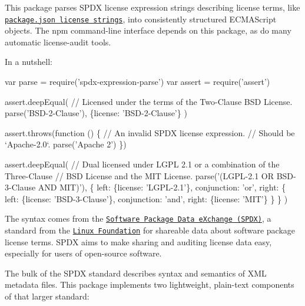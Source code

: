 This package parses S\+P\+DX license expression strings describing license terms, like \href{https://docs.npmjs.com/files/package.json#license}{\tt package.\+json license strings}, into consistently structured E\+C\+M\+A\+Script objects. The npm command-\/line interface depends on this package, as do many automatic license-\/audit tools.

In a nutshell\+:


\begin{DoxyCode}
var parse = require('spdx-expression-parse')
var assert = require('assert')

assert.deepEqual(
  // Licensed under the terms of the Two-Clause BSD License.
  parse('BSD-2-Clause'),
  \{license: 'BSD-2-Clause'\}
)

assert.throws(function () \{
  // An invalid SPDX license expression.
  // Should be `Apache-2.0`.
  parse('Apache 2')
\})

assert.deepEqual(
  // Dual licensed under LGPL 2.1 or a combination of the Three-Clause
  // BSD License and the MIT License.
  parse('(LGPL-2.1 OR BSD-3-Clause AND MIT)'),
  \{
    left: \{license: 'LGPL-2.1'\},
    conjunction: 'or',
    right: \{
      left: \{license: 'BSD-3-Clause'\},
      conjunction: 'and',
      right: \{license: 'MIT'\}
    \}
  \}
)
\end{DoxyCode}


The syntax comes from the \href{https://spdx.org/}{\tt Software Package Data e\+Xchange (S\+P\+DX)}, a standard from the \href{https://www.linuxfoundation.org}{\tt Linux Foundation} for shareable data about software package license terms. S\+P\+DX aims to make sharing and auditing license data easy, especially for users of open-\/source software.

The bulk of the S\+P\+DX standard describes syntax and semantics of X\+ML metadata files. This package implements two lightweight, plain-\/text components of that larger standard\+:



